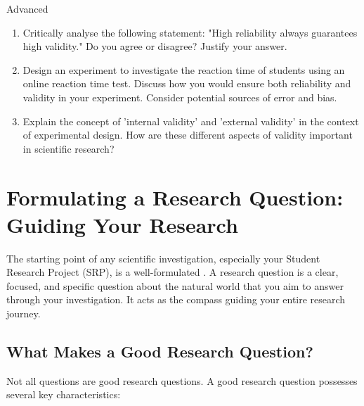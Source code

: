 \begin{tieredquestions}{Advanced}
\begin{enumerate}
    \item Critically analyse the following statement: "High reliability always guarantees high validity."  Do you agree or disagree? Justify your answer.
    \item  Design an experiment to investigate the reaction time of students using an online reaction time test. Discuss how you would ensure both reliability and validity in your experiment. Consider potential sources of error and bias.
    \item  Explain the concept of 'internal validity' and 'external validity' in the context of experimental design.  How are these different aspects of validity important in scientific research? 
\end{enumerate}
\end{tieredquestions}

\section{Formulating a Research Question: Guiding Your Research}

The starting point of any scientific investigation, especially your Student Research Project (SRP), is a well-formulated . A research question is a clear, focused, and specific question about the natural world that you aim to answer through your investigation. It acts as the compass guiding your entire research journey.

\subsection{What Makes a Good Research Question?}

Not all questions are good research questions. A good research question possesses several key characteristics:

